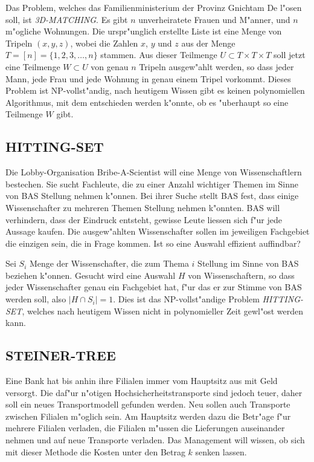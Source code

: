 \medskip

Das Problem, welches das Familienministerium der Provinz Gnichtam De
l"osen soll, ist {\it 3D-MATCHING}. Es gibt $n$ unverheiratete Frauen
und M"anner, und $n$ m"ogliche Wohnungen. Die urspr"unglich erstellte
Liste ist eine Menge von Tripeln $(x,y,z)$, wobei die Zahlen $x$,
$y$ und $z$ aus der Menge $T=[n]=\{1,2,3,\dots,n\}$ stammen. Aus dieser
Teilmenge $U\subset T\times T\times T$ soll jetzt eine 
Teilmenge $W\subset U$ von genau $n$ Tripeln ausgew"ahlt werden, so dass
jeder Mann, jede Frau und jede Wohnung in genau einem Tripel vorkommt.
Dieses Problem ist NP-vollst"andig, 
nach heutigem Wissen gibt es keinen polynomiellen Algorithmus,
mit dem entschieden werden k"onnte, ob es "uberhaupt so eine Teilmenge
$W$ gibt.

\subsection{HITTING-SET}
Die Lobby-Organisation Bribe-A-Scientist will eine Menge von
Wissenschaftlern bestechen.
Sie sucht Fachleute, die zu einer Anzahl wichtiger Themen
im Sinne von BAS Stellung nehmen k"onnen.
Bei ihrer Suche stellt BAS fest, dass einige Wissenschafter
zu mehreren Themen Stellung nehmen k"onnten.
BAS will verhindern, dass der Eindruck entsteht, gewisse
Leute liessen sich f"ur jede Aussage kaufen.
Die ausgew"ahlten Wissenschafter sollen im jeweiligen Fachgebiet
die einzigen sein, die in Frage kommen.
Ist so eine Auswahl effizient auffindbar?

\medskip

Sei $S_i$ Menge der Wissenschafter, die zum Thema $i$ Stellung im
Sinne von BAS beziehen k"onnen. Gesucht wird eine Auswahl
$H$ von Wissenschaftern, so dass jeder Wissenschafter genau
ein Fachgebiet hat, f"ur das er zur Stimme von BAS werden soll,
also $|H\cap S_i|=1$.
Dies ist das NP-vollst"andige Problem {\it HITTING-SET}, welches
nach heutigem Wissen nicht in polynomieller Zeit gewl"ost werden
kann.


\subsection{STEINER-TREE}
Eine Bank hat bis anhin ihre Filialen immer vom Hauptsitz aus mit
Geld versorgt. Die daf"ur n"otigen Hochsicherheitstransporte sind
jedoch teuer, daher soll ein neues Transportmodell gefunden werden.
Neu sollen auch Transporte zwischen Filialen m"oglich sein.
Am Hauptsitz werden dazu die Betr"age f"ur mehrere Filialen
verladen, die Filialen m"ussen die Lieferungen
auseinander nehmen und auf neue Transporte verladen. Das
Management will wissen, ob sich mit dieser Methode die
Kosten unter den Betrag $k$ senken lassen. 

